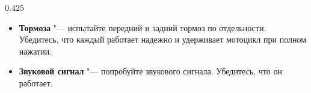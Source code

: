 \begin{langblock}{0.425}
\begin{rus}
\begin{itemize}
			\item \textbf{Тормоза} "--- испытайте передний и задний тормоз по отдельности. Убедитесь, что каждый работает надежно и удерживает мотоцикл при полном нажатии.
			\item \textbf{Звуковой сигнал} "--- попробуйте звукового сигнала. Убедитесь, что он работает.
		\end{itemize}
\end{rus}
\end{langblock}






